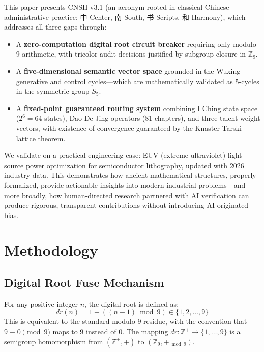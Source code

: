 \documentclass[twocolumn]{article}
\begin{document}
This paper presents CNSH v3.1 (an acronym rooted in classical Chinese administrative practice: 中 Center, 南 South, 书 Scripts, 和 Harmony), which addresses all three gaps through:

\begin{itemize}
  \item A \textbf{zero-computation digital root circuit breaker} requiring only modulo-9 arithmetic, with tricolor audit decisions justified by subgroup closure in $\mathbb{Z}_9$.
  \item A \textbf{five-dimensional semantic vector space} grounded in the Wuxing generative and control cycles—which are mathematically validated as 5-cycles in the symmetric group $S_5$.
  \item A \textbf{fixed-point guaranteed routing system} combining I Ching state space ($2^6 = 64$ states), Dao De Jing operators (81 chapters), and three-talent weight vectors, with existence of convergence guaranteed by the Knaster-Tarski lattice theorem.
\end{itemize}

We validate on a practical engineering case: EUV (extreme ultraviolet) light source power optimization for semiconductor lithography, updated with 2026 industry data. This demonstrates how ancient mathematical structures, properly formalized, provide actionable insights into modern industrial problems—and more broadly, how human-directed research partnered with AI verification can produce rigorous, transparent contributions without introducing AI-originated bias.

\section{Methodology}

\subsection{Digital Root Fuse Mechanism}

\begin{definition}
For any positive integer $n$, the digital root is defined as:
\[
  dr(n) = 1 + ((n-1) \bmod 9) \in \{1,2,\ldots,9\}
\]
This is equivalent to the standard modulo-9 residue, with the convention that $9 \equiv 0 \pmod{9}$ maps to 9 instead of 0. The mapping $dr: \mathbb{Z}^+ \to \{1,\ldots,9\}$ is a semigroup homomorphism from $(\mathbb{Z}^+, +)$ to $(\mathbb{Z}_9, +_{\bmod 9})$.
\end{definition}
\end{document}
